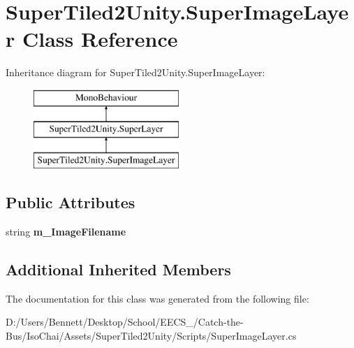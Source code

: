 \hypertarget{class_super_tiled2_unity_1_1_super_image_layer}{}\section{Super\+Tiled2\+Unity.\+Super\+Image\+Layer Class Reference}
\label{class_super_tiled2_unity_1_1_super_image_layer}
Inheritance diagram for Super\+Tiled2\+Unity.\+Super\+Image\+Layer\+:\begin{figure}[H]
\begin{center}
\leavevmode
\includegraphics[height=3.000000cm]{class_super_tiled2_unity_1_1_super_image_layer}
\end{center}
\end{figure}
\subsection*{Public Attributes}
\begin{DoxyCompactItemize}
\item 
\mbox{\label{class_super_tiled2_unity_1_1_super_image_layer_a8450b04c7c11dca699a76fac6a03a8f2}} 
string {\bfseries m\+\_\+\+Image\+Filename}
\end{DoxyCompactItemize}
\subsection*{Additional Inherited Members}


The documentation for this class was generated from the following file\+:\begin{DoxyCompactItemize}
\item 
D\+:/\+Users/\+Bennett/\+Desktop/\+School/\+E\+E\+C\+S\+\_/\+Catch-\/the-\/\+Bus/\+Iso\+Chai/\+Assets/\+Super\+Tiled2\+Unity/\+Scripts/Super\+Image\+Layer.\+cs\end{DoxyCompactItemize}
